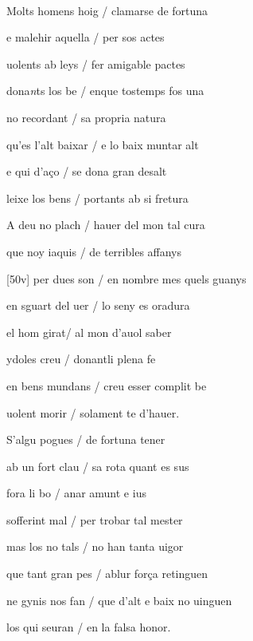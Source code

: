 \documentclass[12pt]{article}
\renewcommand{\espaiAbansEtiquetaPoema}{\vspace{0ex}}
\begin{document}
\begin{estrofa}

\espaiAbansEtiquetaPoema

\\

\end{estrofa}


\begin{estrofa}

 Molts homens hoig / clamarse de fortuna

 e malehir aquella / per sos actes

 uolents ab leys / fer amigable pactes

 dona\textit{n}ts los be / enque tostemps fos una

 no recordant / sa propria natura

 qu'es l'alt baixar / e lo baix muntar alt

 e qui d'a\c{c}o / se dona gran desalt

 leixe los bens / portants ab si fretura

\end{estrofa}



\begin{estrofa}

 A deu no plach / hauer del mon tal cura

 que noy iaquis / de terribles affanys

 [50v] per dues son / en nombre mes quels guanys

 en sguart del uer / lo seny es oradura

 el hom girat/ al mon d'auol saber

 ydoles creu / donantli plena fe

 en bens mundans / creu esser complit be

 uolent morir / solament te d'hauer.

\end{estrofa}



\begin{estrofa}

 S'algu pogues / de fortuna tener

 ab un fort clau / sa rota quant es sus

 fora li bo / anar amunt e ius

 sofferint mal / per trobar tal mester

 mas los no tals / no han tanta uigor

 que tant gran pes / ablur for\c{c}a retinguen

 ne gynis nos fan / que d'alt e baix no uinguen

 los qui seuran / en la falsa honor.

\end{estrofa}
\end{document}
